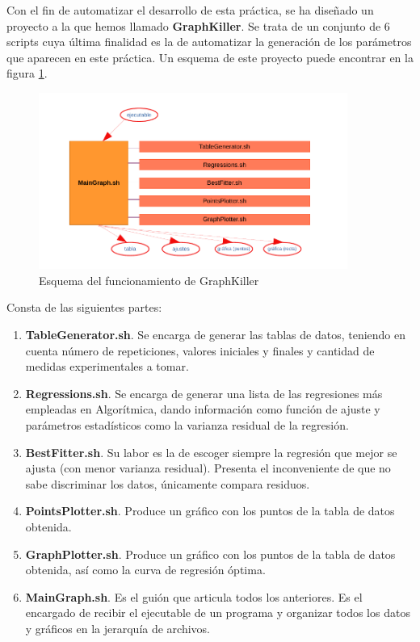 \documentclass{homework}
\begin{document}
    Con el fin de automatizar el desarrollo de esta práctica, se ha diseñado un proyecto a la que hemos llamado 
    \textbf{GraphKiller}. Se trata de un conjunto de 6 scripts cuya última finalidad es la de automatizar la generación
    de los parámetros que aparecen en este práctica. Un esquema de este proyecto puede encontrar en la 
    figura \ref{graph-killer}. 

    \begin{figure}[H]
        \centering
        \includegraphics[width=0.9\textwidth]{img/esquema_graphkiller.pdf}
        \caption{Esquema del funcionamiento de GraphKiller}
        \label{graph-killer}
    \end{figure}

    Consta de las siguientes partes:

    \begin{enumerate}
        \item \textbf{TableGenerator.sh}. Se encarga de generar las tablas de datos, teniendo en cuenta número de repeticiones, valores iniciales y finales y cantidad de medidas experimentales a tomar.
        \item \textbf{Regressions.sh}. Se encarga de generar una lista de las regresiones más empleadas en Algorítmica, dando información como función de ajuste y parámetros estadísticos como la varianza residual de la regresión.
        \item \textbf{BestFitter.sh}. Su labor es la de escoger siempre la regresión que mejor se ajusta (con menor varianza residual). Presenta el inconveniente de que no sabe discriminar los datos, únicamente compara residuos.
        \item \textbf{PointsPlotter.sh}. Produce un gráfico con los puntos de la tabla de datos obtenida.
        \item \textbf{GraphPlotter.sh}. Produce un gráfico con los puntos de la tabla de datos obtenida, así como la curva de regresión óptima. 
        \item \textbf{MainGraph.sh}. Es el guión que articula todos los anteriores. Es el encargado de recibir el ejecutable de un programa y organizar todos los datos y gráficos en la jerarquía de archivos. 
    \end{enumerate}
\end{document}
